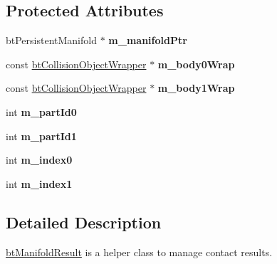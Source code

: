 \subsection*{Protected Attributes}
\begin{DoxyCompactItemize}
\item 
\hypertarget{classbt_manifold_result_ae1bc71e7f8438d547f78511d0e75006e}{bt\+Persistent\+Manifold $\ast$ {\bfseries m\+\_\+manifold\+Ptr}}\label{classbt_manifold_result_ae1bc71e7f8438d547f78511d0e75006e}

\item 
\hypertarget{classbt_manifold_result_a10bb237c8f3a24c983e39a2378170264}{const \hyperlink{structbt_collision_object_wrapper}{bt\+Collision\+Object\+Wrapper} $\ast$ {\bfseries m\+\_\+body0\+Wrap}}\label{classbt_manifold_result_a10bb237c8f3a24c983e39a2378170264}

\item 
\hypertarget{classbt_manifold_result_a2bc1b31381a09d68f1292905d06d358a}{const \hyperlink{structbt_collision_object_wrapper}{bt\+Collision\+Object\+Wrapper} $\ast$ {\bfseries m\+\_\+body1\+Wrap}}\label{classbt_manifold_result_a2bc1b31381a09d68f1292905d06d358a}

\item 
\hypertarget{classbt_manifold_result_a1102526a3290f8d9cd399ed6c11513f1}{int {\bfseries m\+\_\+part\+Id0}}\label{classbt_manifold_result_a1102526a3290f8d9cd399ed6c11513f1}

\item 
\hypertarget{classbt_manifold_result_a5aeb5f67205d6414f832cd2a9a1a6f73}{int {\bfseries m\+\_\+part\+Id1}}\label{classbt_manifold_result_a5aeb5f67205d6414f832cd2a9a1a6f73}

\item 
\hypertarget{classbt_manifold_result_a8d7d067fb1799b3992196f80e8aa3c28}{int {\bfseries m\+\_\+index0}}\label{classbt_manifold_result_a8d7d067fb1799b3992196f80e8aa3c28}

\item 
\hypertarget{classbt_manifold_result_aff6db948e364ab9ed2fc8bb7e7557305}{int {\bfseries m\+\_\+index1}}\label{classbt_manifold_result_aff6db948e364ab9ed2fc8bb7e7557305}

\end{DoxyCompactItemize}


\subsection{Detailed Description}
\hyperlink{classbt_manifold_result}{bt\+Manifold\+Result} is a helper class to manage contact results. 

